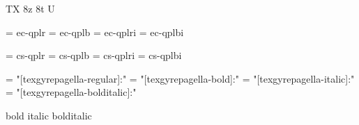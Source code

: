 
\ifx\ffdecl\undefined  \fi

\ffdecl [TG Pagella] {\rm \bf \it \bi} {\caps} {} {TX} {8z 8t U}

\def\caps{\ffsetV{caps}{-sc}\ffsetX}  \def\nocaps{\ffsetV{caps}{}\ffsetX}
\def\capsV{} 

\ismacro{}\ifttrue

   \font\tenrm = ec-qplr  \sizespec
   \font\tenbf = ec-qplb  \sizespec
   \font\tenit = ec-qplri \sizespec
   \font\tenbi = ec-qplbi \sizespec

   \def\ffnamegen{ec-qpl\ffvarV\capsV}

\fi

\ismacro{}\iftrue

   \font\tenrm = cs-qplr  \sizespec
   \font\tenbf = cs-qplb  \sizespec
   \font\tenit = cs-qplri \sizespec
   \font\tenbi = cs-qplbi \sizespec

   \def\ffnamegen{cs-qpl\ffvarV\capsV}
   

\fi

\ismacro{}\iftrue

   \font\tenrm = "[texgyrepagella-regular]:\fontfeatures"    \sizespec
   \font\tenbf = "[texgyrepagella-bold]:\fontfeatures"       \sizespec
   \font\tenit = "[texgyrepagella-italic]:\fontfeatures"     \sizespec
   \font\tenbi = "[texgyrepagella-bolditalic]:\fontfeatures" \sizespec

   \def\ffnamegen{"[texgyrepagella-\ffvarV]:\capsV\fontfeatures"} 

    {bold} {italic} {bolditalic}
   \def\caps{\ffsetV{caps}{+smcp;}\ffsetX}

\fi
\tenrm %

\ifx\loadmathfonts\relax \endinput \fi
\ifx\mathpreloaded X\else  \fi                     

\endinput
